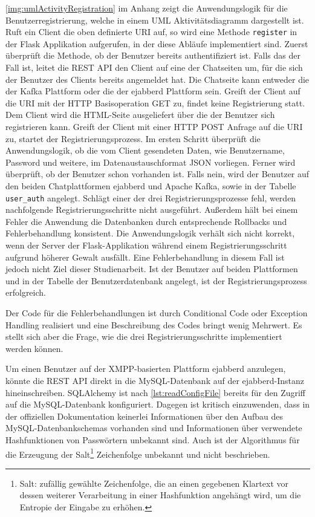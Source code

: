 \documentclass[a4paper,titlepage,halfparskip,12pt]{scrreprt}
\begin{document}
\begin{onehalfspacing}
\autoref{img:umlActivityRegistration} im Anhang zeigt die Anwendungslogik für die Benutzerregistrierung, welche in einem \acs{UML} Aktivitätsdiagramm dargestellt ist. Ruft ein Client die oben definierte \acs{URI} auf, so wird eine Methode \texttt{register} in der Flask Applikation aufgerufen, in der diese Abläufe implementiert sind. Zuerst überprüft die Methode, ob der Benutzer bereits authentifiziert ist. Falls das der Fall ist, leitet die \acs{REST} \acs{API} den Client auf eine der Chatseiten um, für die sich der Benutzer des Clients bereits angemeldet hat. Die Chatseite kann entweder die der Kafka Plattform oder die der ejabberd Plattform sein. Greift der Client auf die \acs{URI} mit der \acs{HTTP} Basisoperation GET zu, findet keine Registrierung statt. Dem Client wird die \acs{HTML}-Seite ausgeliefert über die der Benutzer sich registrieren kann. Greift der Client mit einer \acs{HTTP} POST Anfrage auf die \acs{URI} zu, startet der Registrierungsprozess. Im ersten Schritt überprüft die Anwendungslogik, ob die vom Client gesendeten Daten, wie Benutzername, Password und weitere, im Datenaustauschformat \acs{JSON} vorliegen. Ferner wird überprüft, ob der Benutzer schon vorhanden ist. Falls nein, wird der Benutzer auf den beiden Chatplattformen ejabberd und Apache Kafka, sowie in der Tabelle \texttt{user\_auth} angelegt. Schlägt einer der drei Registrierungsprozesse fehl, werden nachfolgende Registrierungsschritte nicht ausgeführt. Außerdem hält bei einem Fehler die Anwendung die Datenbanken durch entsprechende Rollbacks und Fehlerbehandlung konsistent. Die Anwendungslogik verhält sich nicht korrekt, wenn der Server der Flask-Applikation während einem Registrierungsschritt aufgrund höherer Gewalt ausfällt. Eine Fehlerbehandlung in diesem Fall ist jedoch nicht Ziel dieser Studienarbeit. Ist der Benutzer auf beiden Plattformen und in der Tabelle der Benutzerdatenbank angelegt, ist der Registrierungsprozess erfolgreich.

Der Code für die Fehlerbehandlungen ist durch Conditional Code oder Exception Handling realisiert und eine Beschreibung des Codes bringt wenig Mehrwert. Es stellt sich aber die Frage, wie die drei Registrierungsschritte implementiert werden können.

Um einen Benutzer auf der \acs{XMPP}-basierten Plattform ejabberd anzulegen, könnte die \acs{REST} \acs{API} direkt in die MySQL-Datenbank auf der ejabberd-Instanz hineinschreiben. SQLAlchemy ist nach \autoref{lst:readConfigFile} bereits für den Zugriff auf die MySQL-Datenbank konfiguriert. Dagegen ist kritisch einzuwenden, dass in der offiziellen Dokumentation \cite{ejabberdDoc} keinerlei Informationen über den Aufbau des MySQL-Datenbankschemas vorhanden sind und Informationen über verwendete Hashfunktionen von Passwörtern unbekannt sind. Auch ist der Algorithmus für die Erzeugung der Salt\footnote{Salt: zufällig gewählte Zeichenfolge, die an einen gegebenen Klartext vor dessen weiterer Verarbeitung in einer Hashfunktion angehängt wird, um die Entropie der Eingabe zu erhöhen.\cite{wendzel2018}} Zeichenfolge unbekannt und nicht beschrieben.


\end{onehalfspacing}
\end{document}
